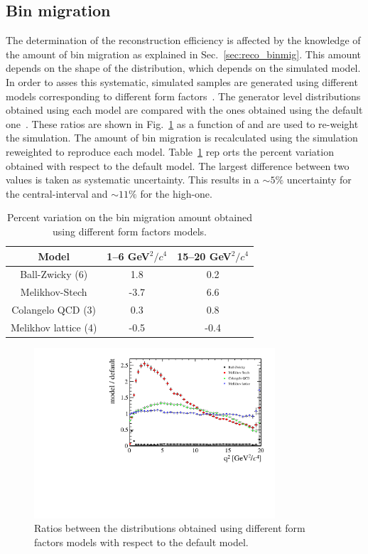\subsection{Bin migration}

The determination of the reconstruction efficiency is affected by the knowledge of the
amount of bin migration as explained in Sec.~\ref{sec:reco_binmig}. This amount depends
on the shape of the \qsq distribution, which depends on the simulated model.
In order to asses this systematic, simulated samples are generated using different
models corresponding to different form factors~\cite{Ball:2004ye,Melikhov:2000yu}.
The generator level distributions obtained using each model are compared with the ones obtained using
the default one~\cite{Ali:1999mm}. These ratios are shown in Fig.~\ref{fig:q2ratios} as a function of \qsq
and are used to re-weight the simulation. The amount of bin migration is recalculated
using the simulation reweighted to reproduce each model.
Table~\ref{tab:sys_binmig} rep
orts the percent variation obtained with respect to the default model. 
The largest difference between two values is taken as systematic uncertainty.
This results in a $\sim5\%$ uncertainty for the central-\qsq interval and $\sim11\%$
for the high-\qsq one.
%
\begin{table}[h!]
\centering
\caption{Percent variation on the bin migration amount obtained using different form factors models.}
\begin{tabular}{|c|c|c|}
\hline
Model                   & 1--6 GeV$^2/c^4$  &  15--20 GeV$^2/c^4$ \\ \hline
Ball-Zwicky (6)         & 1.8          & 0.2    \\
Melikhov-Stech          & -3.7          & 6.6    \\
Colangelo QCD (3)   & 0.3           & 0.8    \\
Melikhov lattice  (4)   & -0.5          & -0.4    \\
\hline 
\end{tabular}
\label{tab:sys_binmig}
\end{table}

\begin{figure}[hb!]
\centering \includegraphics[width=0.8\textwidth]{RKst/figs/models_ratios.pdf}
\caption{Ratios between the \qsq distributions obtained using different form
factors models with respect to the default model. }
\label{fig:q2ratios}
\end{figure}




